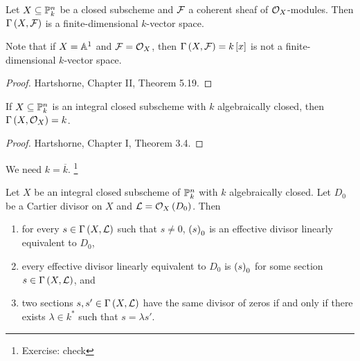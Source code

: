 
\begin{theorem}
Let $ X \subseteq \PP_k^n $ be a closed subscheme and $ \FFF $ a coherent sheaf of $ \OOO_X $-modules. Then $ \Gamma\br{X, \FFF} $ is a finite-dimensional $ k $-vector space.
\end{theorem}

Note that if $ X = \AA^1 $ and $ \FFF = \OOO_X $, then $ \Gamma\br{X, \FFF} = k\sbr{x} $ is not a finite-dimensional $ k $-vector space.

\begin{proof}
Hartshorne, Chapter II, Theorem 5.19.
\end{proof}

\begin{theorem}
If $ X \subseteq \PP_k^n $ is an integral closed subscheme with $ k $ algebraically closed, then $ \Gamma\br{X, \OOO_X} = k $.
\end{theorem}

\begin{proof}
Hartshorne, Chapter I, Theorem 3.4.
\end{proof}

We need $ k = \overline{k} $. \footnote{Exercise: check}

\begin{theorem}
\label{thm:effectivedivisor}
Let $ X $ be an integral closed subscheme of $ \PP_k^n $ with $ k $ algebraically closed. Let $ D_0 $ be a Cartier divisor on $ X $ and $ \LLL = \OOO_X\br{D_0} $. Then
\begin{enumerate}
\item for every $ s \in \Gamma\br{X, \LLL} $ such that $ s \ne 0 $, $ \br{s}_0 $ is an effective divisor linearly equivalent to $ D_0 $,
\item every effective divisor linearly equivalent to $ D_0 $ is $ \br{s}_0 $ for some section $ s \in \Gamma\br{X, \LLL} $, and
\item two sections $ s, s' \in \Gamma\br{X, \LLL} $ have the same divisor of zeros if and only if there exists $ \lambda \in k^* $ such that $ s = \lambda s' $.
\end{enumerate}
\end{theorem}

